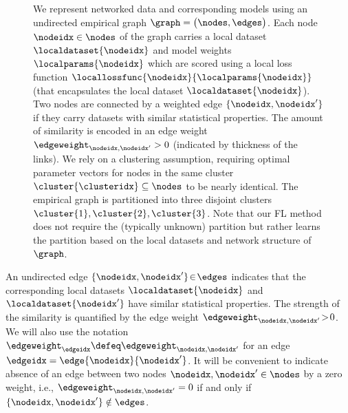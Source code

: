 \documentclass[lettersize,journal]{IEEEtran}
\begin{document}
\begin{figure}
\begin{center}
\caption{\label{fig_local_dataset} We represent networked data and corresponding models using an undirected empirical graph $\graph=\big(\nodes,\edges\big)$. 
	Each node $\nodeidx \in \nodes$ of the graph carries a local dataset $\localdataset{\nodeidx}$ and model weights $\localparams{\nodeidx}$ which 
	are scored using a local loss function $\locallossfunc{\nodeidx}{\localparams{\nodeidx}}$ (that encapsulates the local dataset $\localdataset{\nodeidx}$). 
	Two nodes are connected by a weighted edge $\{\nodeidx,\nodeidx'\}$ if they carry datasets with similar statistical properties. 
	The amount of similarity is encoded in an edge weight $\edgeweight_{\nodeidx,\nodeidx'}>0$ (indicated by thickness of the links). 
	We rely on a clustering assumption, requiring optimal parameter vectors for nodes in the same cluster 
	$\cluster{\clusteridx} \subseteq \nodes$ to be nearly identical. 
	The empirical graph is partitioned into three disjoint clusters $\cluster{1},\cluster{2},\cluster{3}$. 
	Note that our FL method does not require the (typically unknown) partition but rather learns the 
	partition based on the local datasets and network structure of $\graph$. 
}
\end{center}
\vspace{-3mm}
\end{figure} 

An undirected edge $\{\nodeidx,\nodeidx'\}\!\in\!\edges$ indicates that the corresponding local 
datasets $\localdataset{\nodeidx}$ and $\localdataset{\nodeidx'}$ have similar statistical properties. 
The strength of the similarity is quantified by the edge weight $\edgeweight_{\nodeidx,\nodeidx'}\!>\!0$. 
We will also use the notation $\edgeweight_{\edgeidx} \defeq  \edgeweight_{\nodeidx,\nodeidx'}$ for 
an edge $\edgeidx = \edge{\nodeidx}{\nodeidx'}$. 
It will be convenient to indicate absence of an edge between two nodes $\nodeidx,\nodeidx' \in \nodes$ 
by a zero weight, i.e., $\edgeweight_{\nodeidx,\nodeidx'} = 0$ if and only if $\{\nodeidx,\nodeidx'\} \notin \edges$. 
\end{document}
